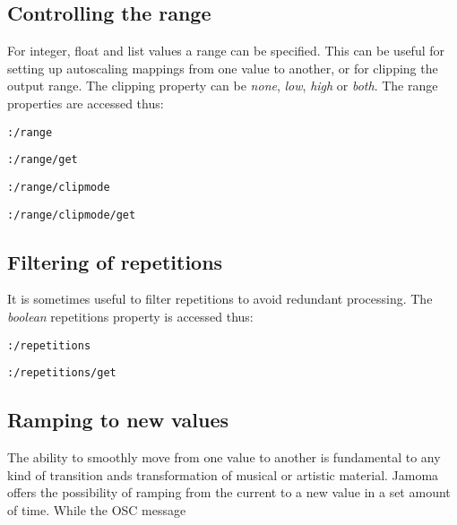 \documentclass{sig-alternate}
\begin{document}




\subsection{Controlling the range} %
\label{sub:range}

For integer, float and list values a range can be specified. This can be useful for setting up autoscaling mappings from one value to another, or for clipping the output range. The clipping property can be \emph{none}, \emph{low}, \emph{high} or \emph{both}. The range properties are accessed thus:

\texttt{:/range}

\texttt{:/range/get}

\texttt{:/range/clipmode}

\texttt{:/range/clipmode/get}





\subsection{Filtering of repetitions} %
\label{sub:filtering_of_repetitions}

It is sometimes useful to filter repetitions to avoid redundant processing. The \emph{boolean} repetitions property is accessed thus:

\texttt{:/repetitions}

\texttt{:/repetitions/get}





\subsection{Ramping to new values} %
\label{sub:ramping_to_new_values}

The ability to smoothly move from one value to another is fundamental to any kind of transition ands transformation of musical or artistic material. Jamoma offers the possibility of ramping from the current to a new value in a set amount of time. While the OSC message
\end{document}
